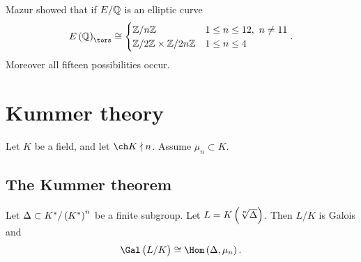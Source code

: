 \begin{remark*}
Mazur showed that if $ E / \mathbb{Q} $ is an elliptic curve
$$ E\br{\QQ}_{\tors} \cong
\begin{cases}
\ZZ / n\ZZ & 1 \le n \le 12, \ n \ne 11 \\
\ZZ / 2\ZZ \times \ZZ / 2n\ZZ & 1 \le n \le 4
\end{cases}.
$$
Moreover all fifteen possibilities occur.
\end{remark*}

\pagebreak

\section{Kummer theory}

Let $ K $ be a field, and let $ \ch K \nmid n $. Assume $ \mu_n \subset K $.

\subsection{The Kummer theorem}

\begin{lemma}
\label{lem:11.1}
Let $ \Delta \subset K^* / \br{K^*}^n $ be a finite subgroup. Let $ L = K\br{\sqrt[n]{\Delta}} $. Then $ L / K $ is Galois and
$$ \Gal\br{L / K} \cong \Hom\br{\Delta, \mu_n}. $$
\end{lemma}

